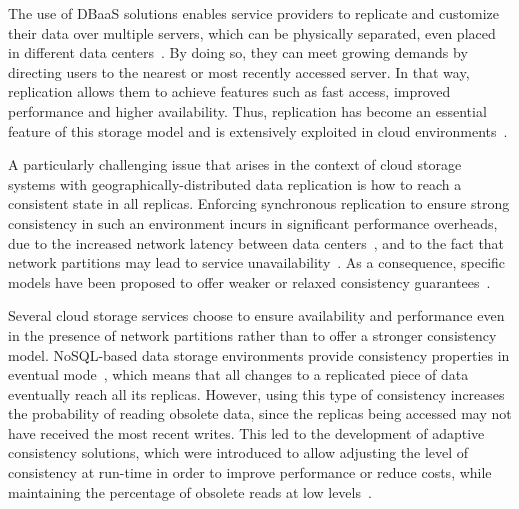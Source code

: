 %
%
The use of DBaaS solutions enables service pro\-viders to replicate
and customize their data over multiple servers, which can be physically separated, even placed in different data centers~\cite{Xiong:2011}.
By doing so, they can meet growing demands by directing users to the nearest or most recently accessed server. In that way, replication allows them to achieve features such as fast access, improved performance and higher availability. Thus, replication has become an essential feature of this storage model and is extensively exploited in cloud environments~\cite{Chang06bigtable:a, Ibrahim12}.

A particularly challenging issue that arises in the context of cloud storage systems with geo\-graphi\-cal\-ly-distributed data replication is how to reach a consistent state in all replicas. 
Enforcing synchronous replication to ensure strong consistency in such an environment incurs in significant performance overheads, due to the increased network latency between data centers~\cite{goel2007data},
and to the fact that network partitions may lead to service unavailability~\cite{Brewer2000}. 
As a consequence, specific models have been proposed to offer weaker or relaxed consistency guarantees~\cite{Vogels:2009}.

Several cloud storage services choose to ensure availability and performance even in the presence of network partitions rather than to offer a stronger consistency model. NoSQL-based data storage environments provide consistency properties in  eventual mode~\cite{Vogels:2009}, which means that all changes to a replicated piece of data eventually reach all its replicas. However, using this type of consistency increases the probability of reading obsolete data, since the replicas being accessed may not have received the most recent writes. This led to the development of adaptive consistency solutions, which were introduced to allow adjusting the level of consistency at run-time in order to improve performance or reduce costs, while maintaining the percentage of obsolete reads at low levels~\cite{chihoub2012harmony, esteves2012quality, Terry:2013}.

